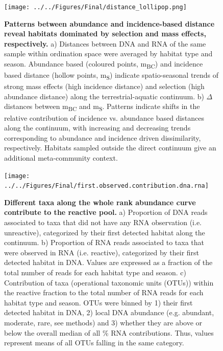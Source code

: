 \documentclass[12pt,a4paper]{article} %
\begin{document}
\begin{figure}[!ht]
\centering
\texttt{[image: ../../Figures/Final/distance\_lollipop.png]}
\caption{\textbf{Patterns between abundance and incidence-based distance reveal habitats dominated by selection and mass effects, respectively.} a) Distances between DNA and RNA of the same sample within ordination space were averaged by habitat type and season. Abundance based (coloured points, m\textsubscript{BC}) and incidence based distance (hollow points, m\textsubscript{S}) indicate spatio-seasonal trends of strong mass effects (high incidence distance) and selection (high abundance distance) along the terrestrial-aquatic continuum. b) $\Delta$ distances between m\textsubscript{BC} and m\textsubscript{S}. Patterns indicate shifts in the relative contribution of incidence vs. abundance based distances along the continuum, with increasing and decreasing trends corresponding to abundance and incidence driven dissimilarity, respectively. Habitats sampled outside the direct continuum give an additional meta-community context.}
\end{figure}

\begin{figure}[!ht]
\centering
\texttt{[image: ../../Figures/Final/first.observed.contribution.dna.rna]}
\caption{\textbf{Different taxa along the whole rank abundance curve contribute to the reactive pool.} a) Proportion of DNA reads associated to taxa that did not have any RNA observation (i.e. unreactive), categorized by their first detected habitat along the continuum. b) Proportion of RNA reads associated to taxa that were observed in RNA (i.e. reactive), categorized by their first detected habitat in DNA. Values are expressed as a fraction of the total number of reads for each habitat type and season. c) Contribution of taxa (operational taxonomic units (OTUs)) within the reactive fraction to the total number of RNA reads for each habitat type and season. OTUs were binned by 1) their first detected habitat in DNA, 2) local DNA abundance (e.g. abundant, moderate, rare, see methods) and 3) whether they are above or below the overall median of all \% RNA contributions. Thus, values represent means of all OTUs falling in the same category.}
\end{figure}
\end{document}

